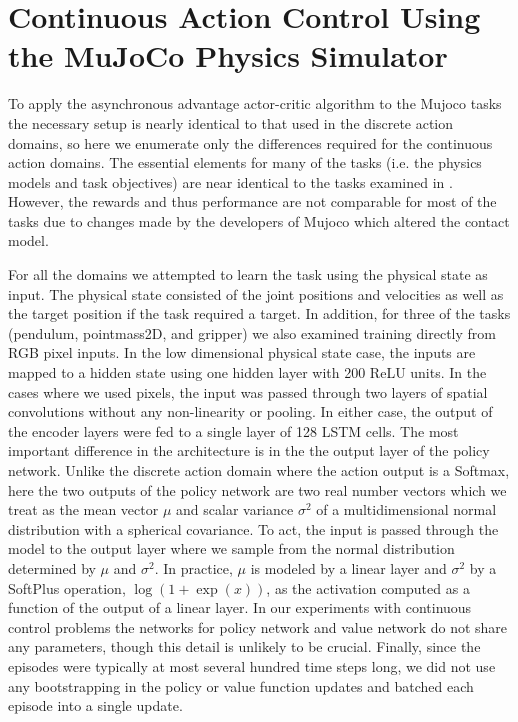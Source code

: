 \documentclass{article} %
\begin{document}
%
%
%
%
%
%
%
%
%
%
%


%

\section{Continuous Action Control Using the MuJoCo Physics Simulator}
\label{sec:mujoco}

%
%
%
%
%
%
%
%
%
%
%
%
%
%
%
%
%
%
%
%
%
%
%
%
%
%
%
%
%
%
%
%
%
%
%
%
%
%
%
%
%

%
%
%
%
%
%
%
%
%
%
%
%
%
%
%

%
%
%
%
%
%
%
%
%
%

To apply the asynchronous advantage actor-critic algorithm to the Mujoco tasks the
necessary setup is nearly identical to that used in the discrete action domains, so
here we enumerate only the differences required for the continuous action domains.
The essential elements for many of the tasks (i.e. the physics models and task objectives)
are near identical to the tasks examined in \citep{lillicrap2015continuous}.
However, the rewards and thus performance are not comparable for most of the tasks due to
changes made by the developers of Mujoco which altered the contact model.

%
For all the domains we attempted to learn the task using the physical state as input.
The physical state consisted of the joint positions and velocities as well
as the target position if the task required a target.
In addition, for three of the tasks (pendulum, pointmass2D, and gripper) we also examined
training directly from RGB pixel inputs.
In the low dimensional physical state case, the inputs are mapped to a hidden state using one hidden layer with 200 ReLU units.
In the cases where we used pixels, the input was passed through two layers of spatial convolutions without any non-linearity or pooling.
In either case, the output of the encoder layers were fed to a single layer of 128 LSTM cells.
The most important difference in the architecture is in the the output layer of the policy
network. Unlike the discrete action domain where the action output is a Softmax, here the two outputs
of the policy network are two real number vectors which we treat
as the mean vector $\mu$ and scalar variance $\sigma^2$ of a multidimensional normal distribution
with a spherical covariance.
To act, the input is passed through the model to the output layer where we sample from the
normal distribution determined by $\mu$ and $\sigma^2$.
In practice, $\mu$ is modeled by a linear layer and $\sigma^2$ by a SoftPlus operation, $\log (1 + \exp (x))$,
as the activation computed as a function of the output of a linear layer.
In our experiments with continuous control problems the networks for policy network
and value network do not share any parameters, though this detail is unlikely to be crucial.
Finally, since the episodes were typically at most several hundred time steps long, we
did not use any bootstrapping in the policy or value function updates and batched each episode
into a single update.
\end{document}
